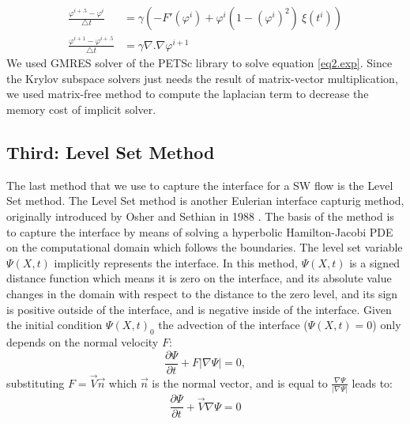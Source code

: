 \documentclass[letterpaper,10pt]{article}
\begin{document}
\begin{align}
\frac{\varphi^{i+.5}-\varphi^i}{\bigtriangleup t}&= \gamma (-F'(\varphi^i)+\varphi^i (1-(\varphi^i)^2)\ \xi(t^i)) \label{eq1.exp}\\
\frac{\varphi^{i+1}-\varphi^{i+.5}}{\bigtriangleup t} &= \gamma \nabla .\nabla \varphi^{i+1} \label{eq2.exp}
\end{align}
We used GMRES solver of the PETSc \cite{petsc-user-ref} library to solve equation \eqref{eq2.exp}. Since the Krylov subspace solvers just needs the result of matrix-vector multiplication, we used matrix-free method to compute the laplacian term to decrease the memory cost of implicit solver.
\subsection{Third: Level Set Method} \label{level set}
The last method that we use to capture the interface for a SW flow is the Level Set method.
The Level Set method is another Eulerian interface capturig method, originally introduced by Osher and Sethian in 1988 \cite{Osher1988}.
The basis of the method is to capture the interface by means of solving a hyperbolic Hamilton-Jacobi PDE on 
the computational domain which follows the boundaries. The level set variable $\varPsi (X,t)$ implicitly represents the interface. In this method, $\varPsi (X,t)$ is a signed distance function which means it is zero on the interface, and its absolute value changes in the domain with respect to the distance to the zero level, and its sign is positive outside of the interface, and is negative inside of the interface. 
Given the initial condition $\varPsi (X,t)_0$ the advection of the interface ($\varPsi (X,t)=0$) only depends on the normal velocity $F$:
\begin{equation}\label{levelseteq1}
        \frac{\partial \varPsi}{\partial t} + F |\nabla \varPsi| = 0,
\end{equation}
substituting $F = \overrightarrow{V} \overrightarrow{n} $ which  $\overrightarrow{n} $ is the normal vector, and is equal to
$ \frac{\nabla \varPsi}{|\nabla \varPsi|}$ leads to:
\begin{equation}\label{levelseteq2}
        \frac{\partial \varPsi}{\partial t} + \overrightarrow{V} \nabla \varPsi = 0
\end{equation}
\end{document}
